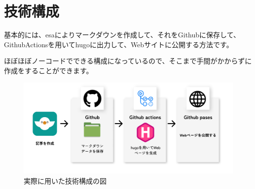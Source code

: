 \chapter{技術構成}
基本的には、esaによりマークダウンを作成して、それをGithubに保存して、GithubActionsを用いてhugoに出力して、Webサイトに公開する方法です。

ほぼほぼノーコードでできる構成になっているので、そこまで手間がかからずに作成をすることができます。

\begin{figure}[H]
  \centering
  \includegraphics[width=14cm]{./image/02-chap4/flow.png}
  \caption{実際に用いた技術構成の図}
  \label{chap4-flow-image}
\end{figure}